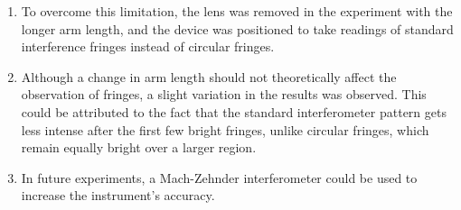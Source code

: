 \begin{enumerate}
	\item To overcome this limitation, the lens was removed in the experiment with the longer arm length, and the device was positioned to take readings of standard interference fringes instead of circular fringes.
	
	\item Although a change in arm length should not theoretically affect the observation of fringes, a slight variation in the results was observed. This could be attributed to the fact that the standard interferometer pattern gets less intense after the first few bright fringes, unlike circular fringes, which remain equally bright over a larger region.
	
	\item In future experiments, a Mach-Zehnder interferometer could be used to increase the instrument's accuracy.
\end{enumerate}
\setcounter{equation}{0}
\setcounter{table}{0}
\setcounter{figure}{0}


    



